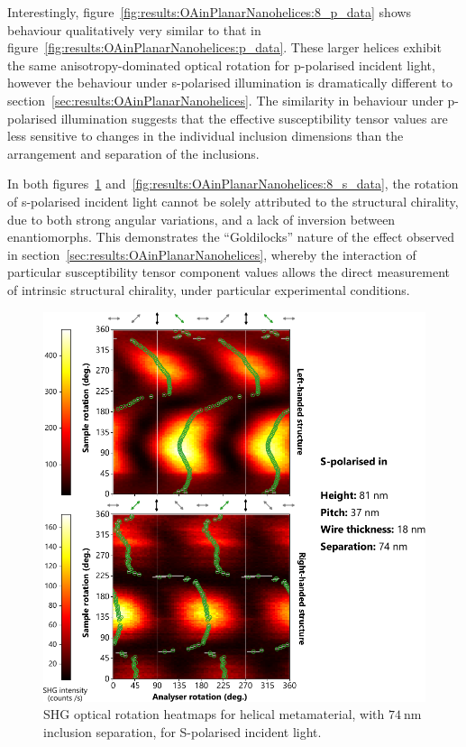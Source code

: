 Interestingly, figure~\ref{fig:results:OAinPlanarNanohelices:8_p_data} shows behaviour qualitatively very similar to that in figure~\ref{fig:results:OAinPlanarNanohelices:p_data}. These larger helices exhibit the same anisotropy-dominated optical rotation for p-polarised incident light, however the behaviour under s-polarised illumination is dramatically different to section~\ref{sec:results:OAinPlanarNanohelices}. The similarity in behaviour under p-polarised illumination suggests that the effective susceptibility tensor values are less sensitive to changes in the individual inclusion dimensions than the arrangement and separation of the inclusions.

In both figures~\ref{fig:results:OAinPlanarNanohelices:b_s_data} and~\ref{fig:results:OAinPlanarNanohelices:8_s_data}, the rotation of s-polarised incident light cannot be solely attributed to the structural chirality, due to both strong angular variations, and a lack of inversion between enantiomorphs. This demonstrates the ``Goldilocks'' nature of the effect observed in section~\ref{sec:results:OAinPlanarNanohelices}, whereby the interaction of particular susceptibility tensor component values allows the direct measurement of intrinsic structural chirality, under particular experimental conditions.

\begin{figure}[htb]	
    \centering	
    \includegraphics[scale=1]{./figures/results/OAinPlanarNanohelices/b_s_data.pdf}
    \caption{\label{fig:results:OAinPlanarNanohelices:b_s_data}
    SHG optical rotation heatmaps for helical metamaterial, with $\SI{74}{\nano\m}$ inclusion separation, for S-polarised incident light.}	
\end{figure}

